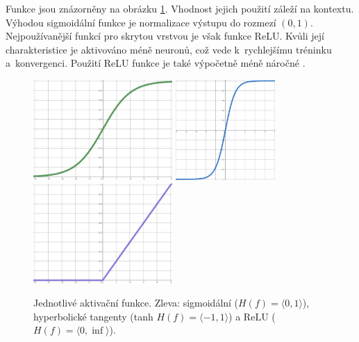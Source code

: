 Funkce jsou znázorněny na obrázku \ref{aktivacni_funkce}. Vhodnost jejich použití záleží na kontextu. Výhodou sigmoidální funkce je normalizace výstupu do rozmezí $(0,1)$. Nejpoužívanější funkcí pro skrytou vrstvou je však funkce ReLU. Kvůli její charakteristice je aktivováno méně neuronů, což vede k~rychlejšímu tréninku a~konvergenci. Použití ReLU funkce je také výpočetně méně náročné \cite{medium:activation_function}.

\begin{figure}[hbt]
    \centering
	    \includegraphics[width=0.33\linewidth, height=1.5in]{obrazky/sigmoid.pdf}\hfill
    	\includegraphics[width=0.33\linewidth, height=1.5in]{obrazky/tanh.pdf}\hfill
    	\includegraphics[width=0.33\linewidth, height=1.5in]{obrazky/relu.pdf}\hfill
	\caption{Jednotlivé aktivační funkce. Zleva: sigmoidální ($H(f)=\langle 0,1 \rangle$), hyperbolické tangenty (tanh $H(f)=\langle -1,1 \rangle$) a ReLU ($H(f)=\langle 0,\inf \rangle$).}
	\label{aktivacni_funkce}
\end{figure}


